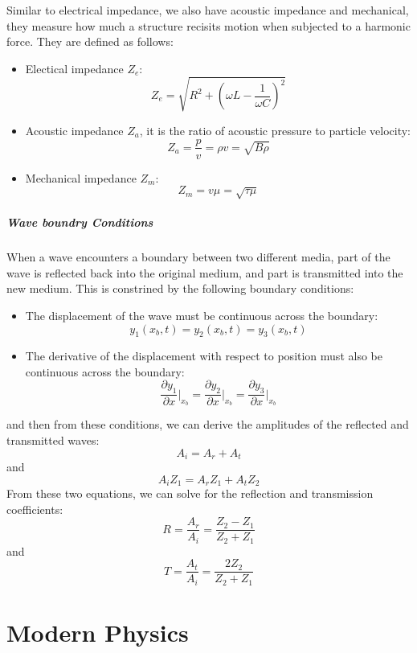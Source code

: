 \documentclass[11pt]{report}
\begin{document}
\begin{definition}[Impedance]
    Similar to electrical impedance, we also have acoustic impedance and mechanical, they measure how much a structure recisits motion when subjected to a harmonic force. They are defined as follows:
    \begin{itemize}
        \item Electical impedance \( Z_e \):
        \begin{equation}
            Z_e = \sqrt{R^2 + \left(\omega L - \frac{1}{\omega C}\right)^2}
        \end{equation}
        \item Acoustic impedance \( Z_a \), it is the ratio of acoustic pressure to particle velocity:
        \begin{equation}
            Z_a = \frac{p}{v} = \rho v = \sqrt{B\rho}
        \end{equation}
        \item Mechanical impedance \( Z_m \):
        \begin{equation}
            Z_m = v\mu = \sqrt{\tau\mu}
        \end{equation}
    \end{itemize}
\end{definition}

\paragraph{Wave boundry Conditions} When a wave encounters a boundary between two different media, part of the wave is reflected back into the original medium, and part is transmitted into the new medium. This is constrined by the following boundary conditions:
\begin{itemize}
    \item The displacement of the wave must be continuous across the boundary:
    \begin{equation}
        y_1(x_b, t) = y_2(x_b, t) = y_3(x_b, t)
    \end{equation}
    \item The derivative of the displacement with respect to position must also be continuous across the boundary:
    \begin{equation}
        \frac{\partial y_1}{\partial x}\bigg|_{x_b} = \frac{\partial y_2}{\partial x}\bigg|_{x_b} = \frac{\partial y_3}{\partial x}\bigg|_{x_b}
    \end{equation}
\end{itemize}
and then from these conditions, we can derive the amplitudes of the reflected and transmitted waves:
\begin{equation}
    A_i = A_r + A_t
\end{equation}
and 
\begin{equation}
    A_i Z_1 = A_r Z_1 + A_t Z_2
\end{equation}
From these two equations, we can solve for the reflection and transmission coefficients:
\begin{equation}
    R = \frac{A_r}{A_i} = \frac{Z_2 - Z_1}{Z_2 + Z_1}
\end{equation}
and
\begin{equation}
    T = \frac{A_t}{A_i} = \frac{2Z_2}{Z_2 + Z_1}
\end{equation}
\chapter{Modern Physics}
\end{document}
